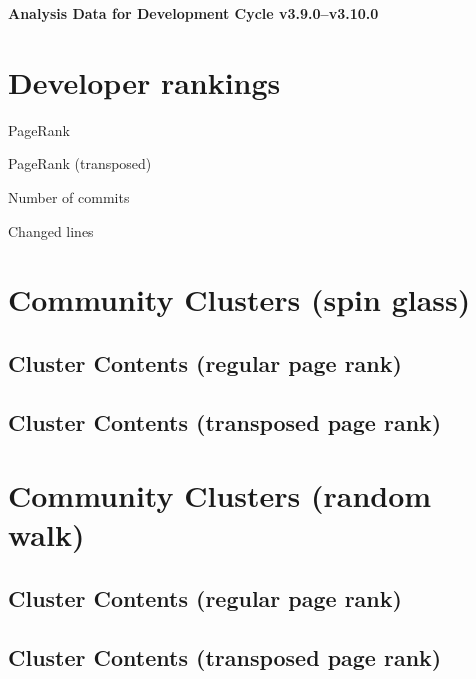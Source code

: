 \documentclass{article}
\begin{document}
\setlength{\parindent}{0pt}
\begin{center}
\begin{Large}
\textbf{Analysis Data for Development Cycle v3.9.0--v3.10.0}
\end{Large}
\end{center}
\section{Developer rankings}
\begin{small}\renewcommand{\tabcolsep}{1pt}
\begin{minipage}{0.5\linewidth}
PageRank\\

\end{minipage}%
\begin{minipage}{0.5\linewidth}
PageRank (transposed)\\

\end{minipage}

\renewcommand{\tabcolsep}{5pt}
\begin{minipage}{0.5\linewidth}
Number of commits\\

\end{minipage}%
\begin{minipage}{0.5\linewidth}
Changed lines\\

\end{minipage}
\end{small}
\newpage\section{Community Clusters (spin glass)}
\subsection{Cluster Contents (regular page rank)}
\newpage\subsection{Cluster Contents (transposed page rank)}
\newpage\section{Community Clusters (random walk)}
\subsection{Cluster Contents (regular page rank)}
\newpage\subsection{Cluster Contents (transposed page rank)}
\end{document}
